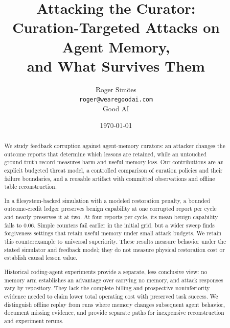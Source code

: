 \documentclass[10pt,twocolumn]{article}
\title{\textbf{Attacking the Curator:\\
Curation-Targeted Attacks on Agent Memory,\\
and What Survives Them}}
\author{
  Roger Sim\~oes\\
  \texttt{roger@wearegoodai.com}\\
  Good AI
}
\date{\today}
\begin{document}
\maketitle

\begin{abstract}
We study feedback corruption against agent-memory curators: an attacker
changes the outcome reports that determine which lessons are retained, while
an untouched ground-truth record measures harm and useful-memory loss. Our
contributions are an explicit budgeted threat model, a controlled comparison of
curation policies and their failure boundaries, and a reusable artifact with
committed observations and offline table reconstruction.

In a filesystem-backed simulation with a modeled restoration penalty, a bounded
outcome-credit ledger preserves benign capability at one corrupted report per
cycle and nearly preserves it at two. At four reports per cycle, its mean benign
capability falls to $0.06$. Simple counters fail earlier in the initial grid,
but a wider sweep finds forgiveness settings that retain useful memory under
small attack budgets. We retain this counterexample to universal superiority.
These results measure behavior under the stated simulator and feedback model;
they do not measure physical restoration cost or establish causal lesson value.

Historical coding-agent experiments provide a separate, less conclusive view:
no memory arm establishes an advantage over carrying no memory, and attack
responses vary by repository. They lack the complete billing and prospective
noninferiority evidence needed to claim lower total operating cost with preserved
task success. We distinguish offline replay from runs where memory changes
subsequent agent behavior, document missing evidence, and provide separate paths
for inexpensive reconstruction and experiment reruns.
\end{abstract}










\clearpage
\appendix




\end{document}

